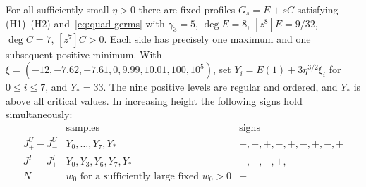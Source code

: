 \begin{lemma}\label{lem:octic-base}
For all sufficiently small $\eta>0$ there are fixed profiles $G_s=E+sC$
satisfying \textup{(H1)}--\textup{(H2)} and~\eqref{eq:quad-germs} with
$\gamma_3=5$, $\deg E=8$, $[z^8]E=9/32$, $\deg C=7$, $[z^7]C>0$.
Each side has precisely one maximum and one subsequent positive minimum.
With $\xi=(-12,-7.62,-7.61,0,9.99,10.01,100,10^5)$, set
$Y_i=E(1)+3\eta^{3/2}\xi_i$ for $0\le i\le7$, and $Y_*=33$.
The nine positive levels are regular and ordered, and $Y_*$ is above all
critical values. In increasing height the following signs hold simultaneously:
\[
\begin{array}{c|c|l}
 &\text{samples}&\text{signs}\\ \hline
 J_+^U-J_-^U &Y_0,\ldots,Y_7,Y_* &+,-,+,-,+,-,+,-,+\\
 J_-^I-J_+^I &Y_0,Y_3,Y_6,Y_7,Y_* &-,+,-,+,-\\
 N & w_0\text{ for a sufficiently large fixed }w_0>0 &-
\end{array}
\]
\end{lemma}

